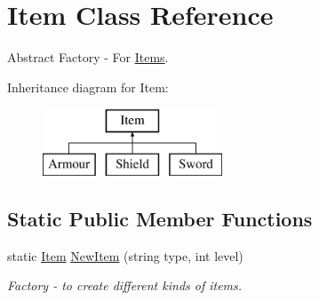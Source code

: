 \hypertarget{class_item}{}\section{Item Class Reference}
\label{class_item}


Abstract Factory -\/ For \mbox{\hyperlink{class_items}{Items}}.  


Inheritance diagram for Item\+:\begin{figure}[H]
\begin{center}
\leavevmode
\includegraphics[height=2.000000cm]{class_item}
\end{center}
\end{figure}
\subsection*{Static Public Member Functions}
\begin{DoxyCompactItemize}
\item 
\mbox{\label{class_item_ab8f02ecfdb0e7333b423635cccaac0ee}} 
static \mbox{\hyperlink{class_item}{Item}} \mbox{\hyperlink{class_item_ab8f02ecfdb0e7333b423635cccaac0ee}{New\+Item}} (string type, int level)
\begin{DoxyCompactList}\small\item\em Factory -\/ to create different kinds of items. \end{DoxyCompactList}\end{DoxyCompactItemize}
